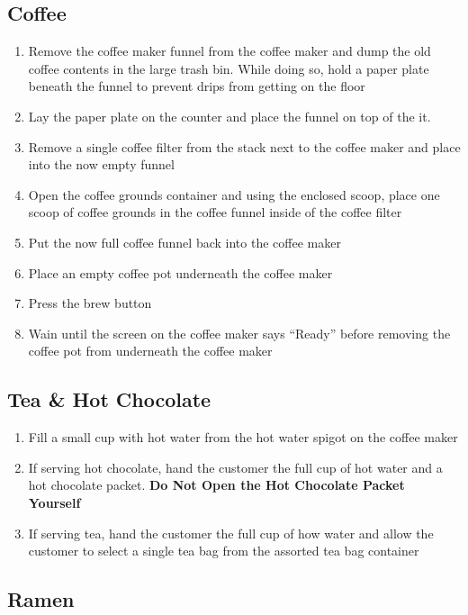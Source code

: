 \documentclass[12pt,onecolumn,letterpaper]{article}
\begin{document}
\subsection{Coffee}
\begin{enumerate}
\item Remove the coffee maker funnel from the coffee maker and dump the old coffee contents in the large trash bin. While doing so, hold a paper plate beneath the funnel to prevent drips from getting on the floor
\item Lay the paper plate on the counter and place the funnel on top of the it.
\item Remove a single coffee filter from the stack next to the coffee maker and place into the now empty funnel
\item Open the coffee grounds container and using the enclosed scoop, place one scoop of coffee grounds in the coffee funnel inside of the coffee filter
\item Put the now full coffee funnel back into the coffee maker
\item Place an empty coffee pot underneath the coffee maker
\item Press the brew button
\item Wain until the screen on the coffee maker says ``Ready'' before removing the coffee pot from underneath the coffee maker  
\end{enumerate}
\subsection{Tea \& Hot Chocolate}
\begin{enumerate}
\item Fill a small cup with hot water from the hot water spigot on the coffee maker
\item If serving hot chocolate, hand the customer the full cup of hot water and a hot chocolate packet. \textbf{Do Not Open the Hot Chocolate Packet Yourself}
\item If serving tea, hand the customer the full cup of how water and allow the customer to select a single tea bag from the assorted tea bag container
\end{enumerate}
\subsection{Ramen}
\end{document}
